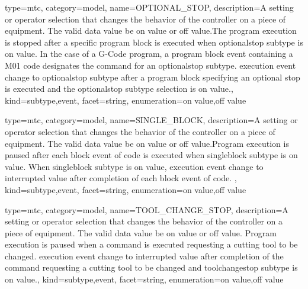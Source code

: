 {
  type=mtc,
  category=model,
  name={OPTIONAL\_STOP},
  description={A setting or operator selection that changes the behavior of the controller on a piece of equipment. \newline The \gls{valid data value} \must be \gls{on value} or \gls{off value}.\newline The program execution is stopped after a specific program block is executed when \gls{optionalstop subtype} is \gls{on value}.    \newline In the case of a G-Code program, a program \gls{block event} containing a M01 code designates the command for an \gls{optionalstop subtype}. \newline \gls{execution event} \must change to \gls{optionalstop subtype} after a program block specifying an optional stop is executed and the \gls{optionalstop subtype} selection is \gls{on value}.},
  kind={subtype,event},
  facet={\gls{string}},
  enumeration={\gls{on value},\gls{off value}}
}


{
  type=mtc,
  category=model,
  name={SINGLE\_BLOCK},
  description={A setting or operator selection that changes the behavior of the controller on a piece of equipment. \newline The \gls{valid data value} \must be \gls{on value} or \gls{off value}.\newline Program execution is paused after each \gls{block event} of code is executed when \gls{singleblock subtype} is \gls{on value}.   \newline When \gls{singleblock subtype} is \gls{on value}, \gls{execution event} \must change to \gls{interrupted value} after completion of each \gls{block event} of code. },
  kind={subtype,event},
  facet={\gls{string}},
  enumeration={\gls{on value},\gls{off value}}
}


{
  type=mtc,
  category=model,
  name={TOOL\_CHANGE\_STOP},
  description={A setting or operator selection that changes the behavior of the controller on a piece of equipment. \newline The \gls{valid data value} \must be \gls{on value} or \gls{off value}. \newline Program execution is paused when a command is executed requesting a cutting tool to be changed. \newline \gls{execution event} \must change to \gls{interrupted value} after completion of the command requesting a cutting tool to be changed and \gls{toolchangestop subtype} is \gls{on value}.},
  kind={subtype,event},
  facet={\gls{string}},
  enumeration={\gls{on value},\gls{off value}}
}



